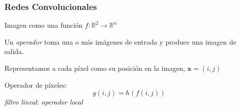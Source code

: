 \documentclass{beamer}
\begin{document}
\begin{frame}[plain]
\begin{figure}[H]
{
    }
\end{figure}
\end{frame}





\begin{frame}[plain]
\frametitle{Redes Convolucionales}
Imagen como una función \(f:\mathbb{R}^2 \to \mathbb{R}^n\) 
\vfill

Un \textit{operador} toma una o más imágenes de entrada y produce una
imagen de salida.  
\vfill
	
Representamos a cada píxel como su posición en la imagen, \(\boldsymbol{x} = (i, j)\)
\vfill
	
Operador de píxeles:
\begin{equation}
g(i,j) = h(f(i,j))
\end{equation}
\vfill
\textit{filtro lineal}: \textit{operador local}
\end{frame}
\end{document}
